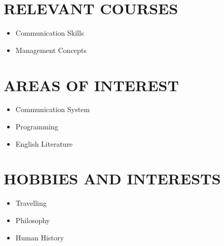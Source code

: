 \documentclass[11pt,a4paper]{article}
\begin{document}
\vspace{4pt}


\section*{RELEVANT COURSES}

\begin{itemize}[leftmargin=*,noitemsep,topsep=0pt]
    \item Communication Skills
    \item Management Concepts
\end{itemize}

\vspace{4pt}


\section*{AREAS OF INTEREST}

\begin{itemize}[leftmargin=*,noitemsep,topsep=0pt]
    \item Communication System
    \item Programming
    \item English Literature
\end{itemize}

\vspace{4pt}


\section*{HOBBIES AND INTERESTS}

\begin{itemize}[leftmargin=*,noitemsep,topsep=0pt]
    \item Travelling
    \item Philosophy
    \item Human History
\end{itemize}
\end{document}
